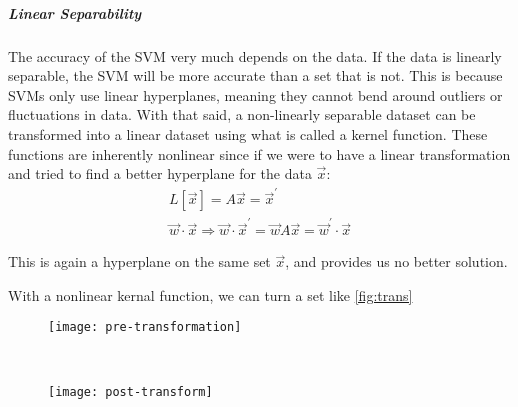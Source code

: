 \subparagraph{Linear Separability}
The accuracy of the SVM very much depends on the data. If the data is linearly separable, the SVM will be more accurate than a set that is not. This is because SVMs only use linear hyperplanes, meaning they cannot bend around outliers or fluctuations in data. With that said, a non-linearly separable dataset can be transformed into a linear dataset using what is called a kernel function. These functions are inherently nonlinear since if we were to have a linear transformation and tried to find a better hyperplane for the data $\vec{x}$:
\begin{equation}
\begin{gathered}
	L[\vec{x}] = A\vec{x} = \vec{x}^{'} \\
	\vec{w}\cdot \vec{x} \Rightarrow \vec{w} \cdot \vec{x}^{'} = \vec{w}A\vec{x} = \vec{w}^{'}\cdot\vec{x} 
\end{gathered}
\end{equation}

This is again a hyperplane on the same set $\vec{x}$, and provides us no better solution.

With a nonlinear kernal function, we can turn a set like \ref{fig:trans}

\begin{figure*}[t!]
	\centering
	\begin{subfigure}[t]{0.5\textwidth}
		\texttt{[image: pre-transformation]}
		\caption{}
		\centering
		\label{fig:pre-trans}
	\end{subfigure}%
~
	\begin{subfigure}[t]{0.5\textwidth}
		\texttt{[image: post-transform]}
		\caption{}
		\centering
		\label{fig:post-trans}
	\end{subfigure}%

	\caption{The data before (\ref{fig:pre-trans}) and after (\ref{fig:post-trans}) the nonlinear kernal function was applied. It is now linearly separable and thus an SVM is a viable classifying tool. }	
	\label{fig:trans}
\end{figure*}

